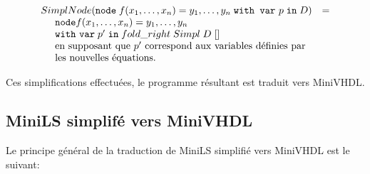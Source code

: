\documentclass[a4paper]{article}
\newcommand{\minivhdl}{{\sc MiniVHDL}}
\newcommand{\mybox}[1]{\mbox{\tt{#1}}}
\newcommand{\ind}[0]{\hspace{0.5cm}}
\newcommand{\Node}[4]{\mybox{node} \; f(#1) = #2 \; \mybox{with var} \
  #3 \; \mybox{in} \; #4}
\begin{document}
\[
\begin{array}{ll}
  \simplnd{\Node{x_1,\dots,x_n}{y_1,\dots,y_n}{p}{D}} & = \\
  \ind \mathtt{node} f(x_1,\dots,x_n) = y_1, \dots, y_n \; \\
  \ind \mathtt{with} \  \mathtt{var} \; p' \; \mathtt{in} \; fold\_right \;Simpl
  \; D \; [] \\
  \ind \mbox{en supposant que $p'$ correspond
             aux variables d\'efinies par} \\ \ind \mbox{les nouvelles \'equations.}
\end{array}
\]

Ces simplifications effectu\'ees, le programme r\'esultant est traduit vers \minivhdl.

\subsection{MiniLS simplif\'e vers MiniVHDL}

Le principe g\'en\'eral de la traduction de MiniLS simplifi\'e vers MiniVHDL est le
suivant:
\end{document}
